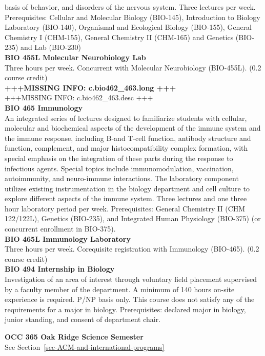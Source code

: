 \documentclass[
  letterpaper,
]{scrbook}
\begin{document}
basis of behavior, and disorders of the nervous system. Three lectures
per week. Prerequisites: Cellular and Molecular Biology (BIO-145),
Introduction to Biology Laboratory (BIO-140), Organismal and Ecological
Biology (BIO-155), General Chemistry I (CHM-155), General Chemistry II
(CHM-165) and Genetics (BIO-235) and Lab (BIO-230)\\
\textbf{BIO 455L Molecular Neurobiology Lab}\\
Three hours per week. Concurrent with Molecular Neurobiology (BIO-455L).
(0.2 course credit)\\
\textbf{+++MISSING INFO: c.bio462\_463.long +++}\\
+++MISSING INFO: c.bio462\_463.desc +++\\
\textbf{BIO 465 Immunology}\\
An integrated series of lectures designed to familiarize students with
cellular, molecular and biochemical aspects of the development of the
immune system and the immune response, including B-and T-cell function,
antibody structure and function, complement, and major
histocompatibility complex formation, with special emphasis on the
integration of these parts during the response to infectious agents.
Special topics include immunomodulation, vaccination, autoimmunity, and
neuro-immune interactions. The laboratory component utilizes existing
instrumentation in the biology department and cell culture to explore
different aspects of the immune system. Three lectures and one three
hour laboratory period per week. Prerequisites: General Chemistry II
(CHM 122/122L), Genetics (BIO-235), and Integrated Human Physiology
(BIO-375) (or concurrent enrollment in BIO-375).\\
\textbf{BIO 465L Immunology Laboratory}\\
Three hours per week. Corequisite registration with Immunology
(BIO-465). (0.2 course credit)\\
\textbf{BIO 494 Internship in Biology}\\
Investigation of an area of interest through voluntary field placement
supervised by a faculty member of the department. A minimum of 140 hours
on-site experience is required. P/NP basis only. This course does not
satisfy any of the requirements for a major in biology. Prerequisites:
declared major in biology, junior standing, and consent of department
chair.

\textbf{OCC 365 Oak Ridge Science Semester}\\
See Section~\ref{sec-ACM-and-international-programs}
\end{document}
